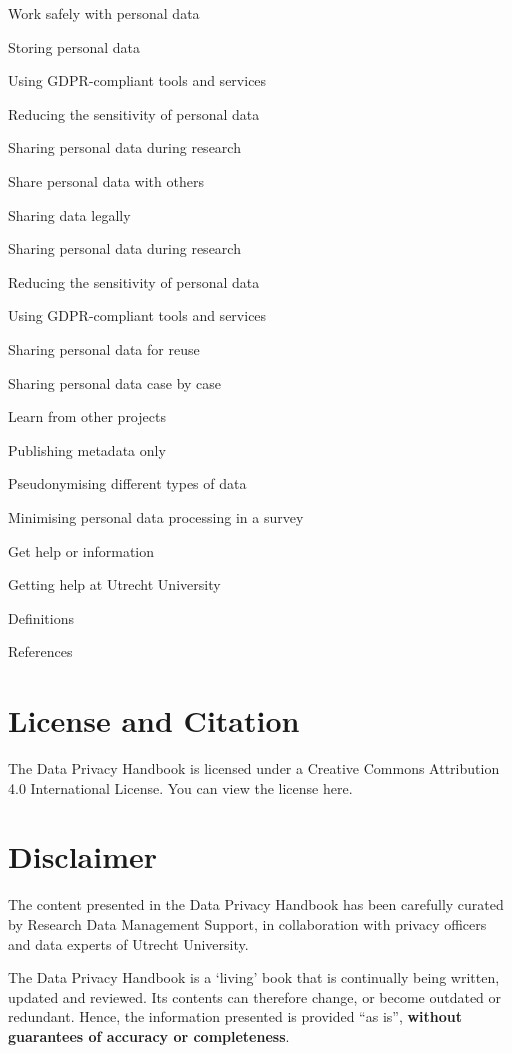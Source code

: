 \documentclass[
]{book}
\begin{document}
Work safely with personal data

Storing personal data

Using GDPR-compliant tools and services

Reducing the sensitivity of personal data

Sharing personal data during research

Share personal data with others

Sharing data legally

Sharing personal data during research

Reducing the sensitivity of personal data

Using GDPR-compliant tools and services

Sharing personal data for reuse

Sharing personal data case by case

Learn from other projects

Publishing metadata only

Pseudonymising different types of data

Minimising personal data processing in a survey

Get help or information

Getting help at Utrecht University

Definitions

References

\hypertarget{license-and-citation}{%
\section{License and Citation}\label{license-and-citation}}

The Data Privacy Handbook is licensed under a Creative Commons Attribution 4.0 International License. You can
view
the license here.

\hypertarget{disclaimer}{%
\section{Disclaimer}\label{disclaimer}}

The content presented in the Data Privacy Handbook has been carefully curated by
Research Data Management Support, in collaboration with privacy officers and
data experts of Utrecht University.

The Data Privacy Handbook is a `living' book that is continually being written,
updated and reviewed. Its contents can therefore change, or become outdated or
redundant. Hence, the information presented is provided ``as is'', \textbf{without
guarantees of accuracy or completeness}.
\end{document}
